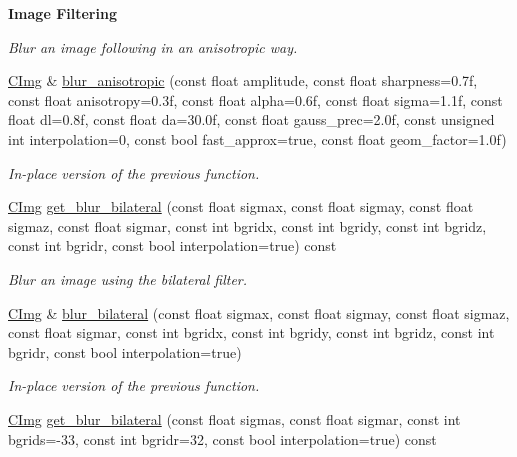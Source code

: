 \begin{Indent}{\bf Image Filtering}
\begin{DoxyCompactItemize}
\begin{DoxyCompactList}\small\item\em Blur an image following in an anisotropic way. \end{DoxyCompactList}\item 
\hypertarget{structcimg__library_1_1_c_img_ae1f84575eb2f9ab5a5747ecdbb42a099}{\hyperlink{structcimg__library_1_1_c_img}{C\-Img} \& \hyperlink{structcimg__library_1_1_c_img_ae1f84575eb2f9ab5a5747ecdbb42a099}{blur\-\_\-anisotropic} (const float amplitude, const float sharpness=0.\-7f, const float anisotropy=0.\-3f, const float alpha=0.\-6f, const float sigma=1.\-1f, const float dl=0.\-8f, const float da=30.\-0f, const float gauss\-\_\-prec=2.\-0f, const unsigned int interpolation=0, const bool fast\-\_\-approx=true, const float geom\-\_\-factor=1.\-0f)}\label{structcimg__library_1_1_c_img_ae1f84575eb2f9ab5a5747ecdbb42a099}

\begin{DoxyCompactList}\small\item\em In-\/place version of the previous function. \end{DoxyCompactList}\item 
\hyperlink{structcimg__library_1_1_c_img}{C\-Img} \hyperlink{structcimg__library_1_1_c_img_a71de368e4aea0a45847a7d0b11b4a986}{get\-\_\-blur\-\_\-bilateral} (const float sigmax, const float sigmay, const float sigmaz, const float sigmar, const int bgridx, const int bgridy, const int bgridz, const int bgridr, const bool interpolation=true) const 
\begin{DoxyCompactList}\small\item\em Blur an image using the bilateral filter. \end{DoxyCompactList}\item 
\hypertarget{structcimg__library_1_1_c_img_ae409a74bd30e2f16e4731572bc2e2153}{\hyperlink{structcimg__library_1_1_c_img}{C\-Img} \& \hyperlink{structcimg__library_1_1_c_img_ae409a74bd30e2f16e4731572bc2e2153}{blur\-\_\-bilateral} (const float sigmax, const float sigmay, const float sigmaz, const float sigmar, const int bgridx, const int bgridy, const int bgridz, const int bgridr, const bool interpolation=true)}\label{structcimg__library_1_1_c_img_ae409a74bd30e2f16e4731572bc2e2153}

\begin{DoxyCompactList}\small\item\em In-\/place version of the previous function. \end{DoxyCompactList}\item 
\hypertarget{structcimg__library_1_1_c_img_a32faf1d312ee2f95b72c854f13fa14c4}{\hyperlink{structcimg__library_1_1_c_img}{C\-Img} \hyperlink{structcimg__library_1_1_c_img_a32faf1d312ee2f95b72c854f13fa14c4}{get\-\_\-blur\-\_\-bilateral} (const float sigmas, const float sigmar, const int bgrids=-\/33, const int bgridr=32, const bool interpolation=true) const }\label{structcimg__library_1_1_c_img_a32faf1d312ee2f95b72c854f13fa14c4}


\end{DoxyCompactItemize}
\end{Indent}
